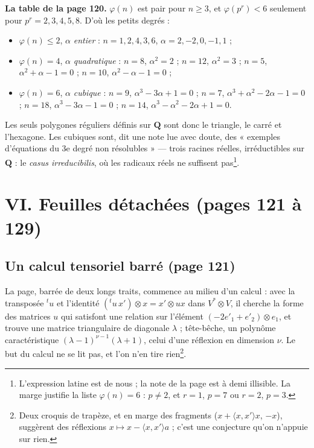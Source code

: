 \documentclass[11pt,a4paper]{article}
\begin{document}
\textbf{La table de la page 120.} $\varphi(n)$ est pair pour $n \geq 3$, et
$\varphi(p^r) < 6$ seulement pour $p^r = 2, 3, 4, 5, 8$. D'où les petits
degrés :
\begin{itemize}
  \item $\varphi(n) \leq 2$, $\alpha$ \emph{entier} : $n = 1, 2, 4, 3, 6$,
    $\alpha = 2, -2, 0, -1, 1$ ;
  \item $\varphi(n) = 4$, $\alpha$ \emph{quadratique} : $n = 8$, $\alpha^2 = 2$ ;
    $n = 12$, $\alpha^2 = 3$ ; $n = 5$, $\alpha^2 + \alpha - 1 = 0$ ; $n = 10$,
    $\alpha^2 - \alpha - 1 = 0$ ;
  \item $\varphi(n) = 6$, $\alpha$ \emph{cubique} : $n = 9$, $\alpha^3 - 3\alpha
    + 1 = 0$ ; $n = 7$, $\alpha^3 + \alpha^2 - 2\alpha - 1 = 0$ ; $n = 18$,
    $\alpha^3 - 3\alpha - 1 = 0$ ; $n = 14$, $\alpha^3 - \alpha^2 - 2\alpha + 1 =
    0$.
\end{itemize}
Les seuls polygones réguliers définis sur $\mathbf{Q}$ sont donc le triangle,
le carré et l'hexagone. Les cubiques sont, dit une note lue avec doute,
des « exemples d'équations du 3e degré non résolubles » --- trois
racines réelles, irréductibles sur $\mathbf{Q}$ : le \emph{casus
irreducibilis}, où les radicaux réels ne suffisent pas\footnote{L'expression
latine est de nous ; la note de la page est à demi illisible. La marge
justifie la liste $\varphi(n) = 6$ : $p \neq 2$, et $r = 1$, $p = 7$ ou $r =
2$, $p = 3$.}.

\section*{VI. Feuilles détachées (pages 121 à 129)}

\subsection*{Un calcul tensoriel barré (page 121)}

La page, barrée de deux longs traits, commence au milieu d'un calcul : avec la
transposée ${}^t u$ et l'identité $({}^t u\, x') \otimes x = x' \otimes u x$
dans $V^{*} \otimes V$, il cherche la forme des matrices $u$ qui satisfont une
relation sur l'élément $(-2e'_1 + e'_2) \otimes e_1$, et trouve une matrice
triangulaire de diagonale $\lambda$ ; tête-bêche, un polynôme caractéristique
$(\lambda - 1)^{\nu - 1}(\lambda + 1)$, celui d'une réflexion en dimension
$\nu$. Le but du calcul ne se lit pas, et l'on n'en tire rien\footnote{Deux
croquis de trapèze, et en marge des fragments ($x + \langle x, x' \rangle x$,
$-x$), suggèrent des réflexions $x \mapsto x - \langle x, x' \rangle a$ ; c'est
une conjecture qu'on n'appuie sur rien.}.
\end{document}
